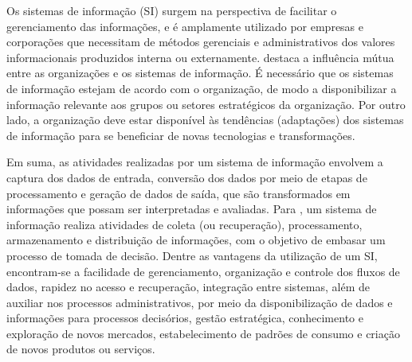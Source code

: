 Os sistemas de informação (SI) surgem na perspectiva de facilitar o gerenciamento das informações, e é amplamente utilizado por empresas e corporações que necessitam de métodos gerenciais e administrativos dos valores informacionais produzidos interna ou externamente. \citet{laudon} destaca a influência mútua entre as organizações e os sistemas de informação. É necessário que os sistemas de informação estejam de acordo com o organização, de modo a disponibilizar a informação relevante aos grupos ou setores estratégicos da organização. Por outro lado, a organização deve estar disponível às tendências (adaptações) dos sistemas de informação para se beneficiar de novas tecnologias e transformações.

Em suma,  as atividades realizadas por um sistema de informação envolvem a captura dos dados de entrada, conversão dos dados por meio de etapas de processamento e geração de dados de saída, que são transformados em informações que possam ser interpretadas e avaliadas. Para \citet{laudon}, um sistema de informação realiza atividades de coleta (ou recuperação), processamento, armazenamento e distribuição de informações, com o objetivo de embasar um processo de tomada de decisão. Dentre as vantagens da utilização de um SI, encontram-se a facilidade de gerenciamento, organização e controle dos fluxos de dados, rapidez no acesso e recuperação, integração entre sistemas, além de auxiliar nos processos administrativos, por meio da disponibilização de dados e informações para processos decisórios, gestão estratégica, conhecimento e exploração de novos mercados, estabelecimento de padrões de consumo e criação de novos produtos ou serviços.

